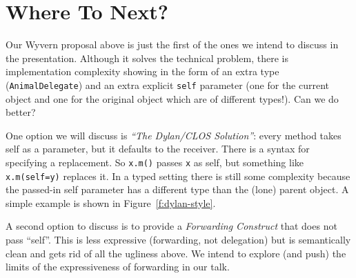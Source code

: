 \documentclass[preprint,10pt]{sigplanconf}
\begin{document}


\section{Where To Next?}



Our Wyvern proposal above is just the first of the ones we intend to discuss in the presentation.  Although it solves the technical problem, there is implementation complexity showing in the form of an extra type (\texttt{AnimalDelegate}) and an extra explicit \texttt{self} parameter (one for the current object and one for the original object which are of different types!). Can we do better?

One option we will discuss is \textit{``The Dylan/CLOS Solution''}: every method takes self as a parameter, but it defaults to the receiver. There is a syntax for specifying a replacement. So \texttt{x.m()} passes \texttt{x} as self, but something like \texttt{x.m(self=y)} replaces it. In a typed setting there is still some complexity because the passed-in self parameter has a different type than the (lone) parent object. A simple example is shown in Figure~\ref{f:dylan-style}.

A second option to discuss is to provide a \textit{Forwarding Construct} that does not pass ``self''. This is less expressive (forwarding, not delegation) but is semantically clean and gets rid of all the ugliness above. We intend to explore (and push) the limits of the expressiveness of forwarding in our talk.

\end{document}
